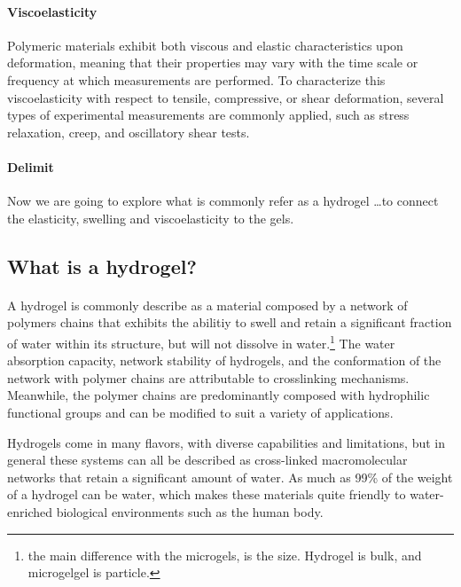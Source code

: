 \paragraph{Viscoelasticity} Polymeric materials exhibit both viscous and elastic characteristics upon deformation, meaning that their properties may vary with the time scale or frequency at which measurements are performed. 
To characterize this viscoelasticity with respect to tensile, compressive, or shear deformation, several types of experimental measurements are commonly applied, such as stress relaxation, creep, and oscillatory shear tests\citep{guPolymerNetworksPlastics2020}. 

\paragraph{Delimit} Now we are going to explore what is commonly refer as a hydrogel \dots to connect the elasticity, swelling and viscoelasticity to the gels.

\subsection{What is a hydrogel?}

\paragraph{}
A hydrogel is commonly describe as a material composed by a network of polymers chains that exhibits the abilitiy to swell and retain a significant fraction of water within its structure, but will not dissolve in water\citep{ahmedHydrogelPreparationCharacterization2015a,ahmedHydrogelsMicrogelsDriving2025,priyaComprehensiveReviewHydrogel2024,bustamantetorresHydrogelsClassificationAccording2021}.\footnote{the main difference with the microgels, is the size. Hydrogel is bulk, and microgelgel is particle.}
The water absorption capacity, network stability of hydrogels, and the conformation of the network with polymer chains are attributable to crosslinking mechanisms\citep{priyaComprehensiveReviewHydrogel2024,ahmedHydrogelPreparationCharacterization2015a}.
Meanwhile, the polymer chains are predominantly composed with hydrophilic functional groups and can be modified to suit a variety of applications\citep{ahmedHydrogelPreparationCharacterization2015a,priyaComprehensiveReviewHydrogel2024,bustamantetorresHydrogelsClassificationAccording2021}.

Hydrogels come in many flavors, with diverse capabilities and limitations, but in general these systems can all be described as cross-linked macromolecular networks that retain a significant amount of water. 
As much as 99\% of the weight of a hydrogel can be water, which makes these materials quite friendly to water-enriched biological environments such as the human body\citep{correaTranslationalApplicationsHydrogels2021}. 

